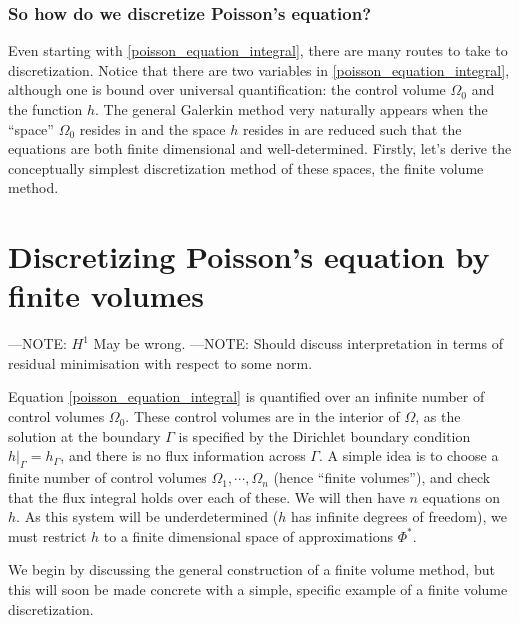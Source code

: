 \subsubsection{So how do we discretize Poisson's equation?}
Even starting with \eqref{poisson_equation_integral}, there are many routes to take to discretization.
Notice that there are two variables in \eqref{poisson_equation_integral}, although one is bound over universal quantification:
the control volume $\Omega_0$ and the function $h$.
The general Galerkin method very naturally appears when the ``space'' $\Omega_0$ resides in and the space $h$ resides in are reduced
such that the equations are both finite dimensional and well-determined. Firstly, let's derive the conceptually simplest
discretization method of these spaces, the finite volume method.


\section{Discretizing Poisson's equation by finite volumes}\label{discretizing_poisson}
---NOTE: $H^1$ May be wrong.
---NOTE: Should discuss interpretation in terms of residual minimisation with respect to some norm.
\vskip 0.5in

Equation \eqref{poisson_equation_integral} is quantified over an infinite number of control volumes $\Omega_0$.
These control volumes are in the interior of $\Omega$, as the solution at the boundary $\Gamma$ is specified by the Dirichlet boundary condition
$\left.h\right|_\Gamma = h_\Gamma$, and there is no flux information across $\Gamma$.
A simple idea is to choose a finite number of control volumes $\Omega_1,\cdots,\Omega_n$ (hence ``finite volumes''), and check that the flux integral holds over each of these.
We will then have $n$ equations on $h$. As this system will be underdetermined ($h$ has infinite degrees of freedom), we must
restrict $h$ to a finite dimensional space of approximations $\Phi^*$.

We begin by discussing the general construction of a finite volume method, but this will soon be made concrete with a simple, specific example of a 
finite volume discretization.


